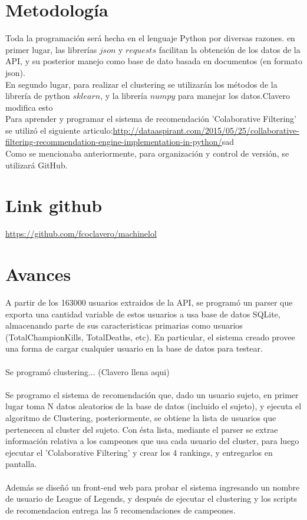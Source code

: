 \documentclass[letterpaper,11pt, spanish]{article}
\begin{document}
\section{Metodología}

Toda la programación será hecha en el lenguaje Python por diversas razones. en
primer lugar, las librerías $json$ y $requests$ facilitan la obtención de los
datos de la API, y su posterior manejo como base de dato basada en documentos
(en formato json).\\

En segundo lugar, para realizar el clustering se utilizarán
los métodos de la librería de python $sklearn$, y la librería $numpy$ para
manejar los datos.Clavero modifica esto \\

Para aprender y programar el sistema de recomendación 'Colaborative Filtering' se utilizó el siguiente articulo:\url{http://dataaspirant.com/2015/05/25/collaborative-filtering-recommendation-engine-implementation-in-python/}{sad}\\

Como se mencionaba anteriormente, para organización y control de versión, se
utilizará GitHub.

\section{Link github}
\url{https://github.com/fcoclavero/machinelol}
\section{Avances}
A partir de los 163000 usuarios extraidos de la API, se programó un parser que exporta una cantidad variable de estos usuarios a usa base de datos SQLite, almacenando parte de sus caracteristicas primarias como usuarios (TotalChampionKills, TotalDeaths, etc). En particular, el sistema creado provee una forma de cargar cualquier usuario en la base de datos para testear.\\
\\
Se programó clustering... (Clavero llena aqui)\\
\\
Se programo el sistema de recomendación que, dado un usuario sujeto, en primer lugar toma N datos aleatorios de la base de datos (incluido el sujeto), y ejecuta el algoritmo de Clustering, posteriormente, se obtiene la lista de usuarios que pertenecen al cluster del sujeto. Con ésta lista, mediante el parser se extrae información relativa a los campeones que usa cada usuario del cluster, para luego ejecutar el 'Colaborative Filtering' y crear los 4 rankings, y entregarlos en pantalla.\\
\\
Además se diseñó un front-end web para probar el sistema ingresando un nombre de usuario de League of Legends, y después de ejecutar el clustering y los scripts de recomendacion entrega las 5 recomendaciones de campeones.
\end{document}
